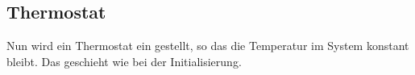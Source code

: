 \subsection*{Thermostat}
Nun wird ein Thermostat ein gestellt, so das die Temperatur im System konstant bleibt.
Das geschieht wie bei der Initialisierung.
\begin{figure}[h!]
	\centering
	
\end{figure}